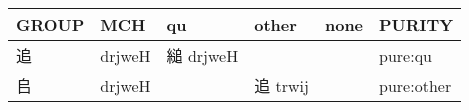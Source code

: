 \documentclass[14pt,a4paper]{scrartcl}
\begin{document}
\begin{longtable}[c]{@{}llllll@{}}
\toprule
\begin{minipage}[b]{0.14\columnwidth}\raggedright\strut
GROUP
\strut\end{minipage} &
\begin{minipage}[b]{0.14\columnwidth}\raggedright\strut
MCH
\strut\end{minipage} &
\begin{minipage}[b]{0.14\columnwidth}\raggedright\strut
qu
\strut\end{minipage} &
\begin{minipage}[b]{0.14\columnwidth}\raggedright\strut
other
\strut\end{minipage} &
\begin{minipage}[b]{0.14\columnwidth}\raggedright\strut
none
\strut\end{minipage} &
\begin{minipage}[b]{0.14\columnwidth}\raggedright\strut
PURITY
\strut\end{minipage}\tabularnewline
\midrule
\endhead
\begin{minipage}[t]{0.14\columnwidth}\raggedright\strut
追
\strut\end{minipage} &
\begin{minipage}[t]{0.14\columnwidth}\raggedright\strut
drjweH
\strut\end{minipage} &
\begin{minipage}[t]{0.14\columnwidth}\raggedright\strut
縋 drjweH
\strut\end{minipage} &
\begin{minipage}[t]{0.14\columnwidth}\raggedright\strut
\strut\end{minipage} &
\begin{minipage}[t]{0.14\columnwidth}\raggedright\strut
\strut\end{minipage} &
\begin{minipage}[t]{0.14\columnwidth}\raggedright\strut
pure:qu
\strut\end{minipage}\tabularnewline
\begin{minipage}[t]{0.14\columnwidth}\raggedright\strut
𠂤
\strut\end{minipage} &
\begin{minipage}[t]{0.14\columnwidth}\raggedright\strut
drjweH
\strut\end{minipage} &
\begin{minipage}[t]{0.14\columnwidth}\raggedright\strut
\strut\end{minipage} &
\begin{minipage}[t]{0.14\columnwidth}\raggedright\strut
追 trwij
\strut\end{minipage} &
\begin{minipage}[t]{0.14\columnwidth}\raggedright\strut
\strut\end{minipage} &
\begin{minipage}[t]{0.14\columnwidth}\raggedright\strut
pure:other
\strut\end{minipage}\tabularnewline
\bottomrule
\end{longtable}
\end{document}
